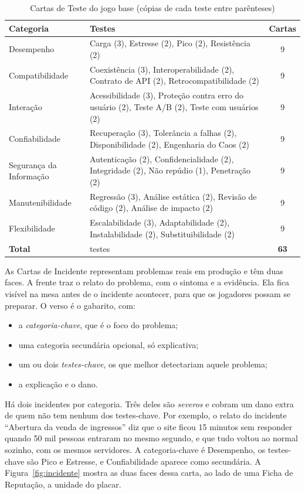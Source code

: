 \begin{table}[ht]
  \centering
  \caption{Cartas de Teste do jogo base (cópias de cada teste entre parênteses)}
  \label{tab:cartas}
  \footnotesize
  \begin{tabularx}{\linewidth}{>{\raggedright\arraybackslash}p{3.3cm} >{\raggedright\arraybackslash}X c}
    \toprule
    Categoria & Testes & Cartas \\
    \midrule
    Desempenho & Carga (3), Estresse (2), Pico (2), Resistência (2) & 9 \\
    Compatibilidade & Coexistência (3), Interoperabilidade (2), Contrato de API (2), Retrocompatibilidade (2) & 9 \\
    Interação & Acessibilidade (3), Proteção contra erro do usuário (2), Teste A/B (2), Teste com usuários (2) & 9 \\
    Confiabilidade & Recuperação (3), Tolerância a falhas (2), Disponibilidade (2), Engenharia do Caos (2) & 9 \\
    Segurança da Informação & Autenticação (2), Confidencialidade (2), Integridade (2), Não repúdio (1), Penetração (2) & 9 \\
    Manutenibilidade & Regressão (3), Análise estática (2), Revisão de código (2), Análise de impacto (2) & 9 \\
    Flexibilidade & Escalabilidade (3), Adaptabilidade (2), Instalabilidade (2), Substituibilidade (2) & 9 \\
    \midrule
    \textbf{Total} & 29 testes & \textbf{63} \\
    \bottomrule
  \end{tabularx}
\end{table}

As Cartas de Incidente representam problemas reais em produção e têm duas faces. A frente traz o relato do
problema, com o sintoma e a evidência. Ela fica visível na mesa antes de o incidente acontecer, para que os
jogadores possam se preparar. O verso é o gabarito, com:
\begin{itemize}
  \item a \emph{categoria-chave}, que é o foco do problema;
  \item uma categoria secundária opcional, só explicativa;
  \item um ou dois \emph{testes-chave}, os que melhor detectariam aquele problema;
  \item a explicação e o dano.
\end{itemize}
Há dois incidentes por categoria. Três deles são \emph{severos} e cobram um dano extra de quem não tem nenhum dos
testes-chave. Por exemplo, o relato do incidente ``Abertura da venda de ingressos'' diz que o site ficou 15
minutos sem responder quando 50 mil pessoas entraram no mesmo segundo, e que tudo voltou ao normal sozinho, com
os mesmos servidores. A categoria-chave é Desempenho, os testes-chave são Pico e Estresse, e Confiabilidade
aparece como secundária. A Figura~\ref{fig:incidente} mostra as duas faces dessa carta, ao lado de uma Ficha de
Reputação, a unidade do placar.

